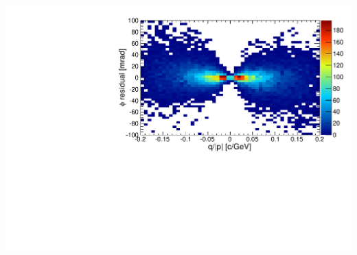 \documentclass[compress]{beamer}
\begin{document}
\begin{frame}
\begin{columns}
\includegraphics[width=\linewidth]{simple2d_qoverpmag.pdf}
\end{columns}
\end{frame}
\end{document}
